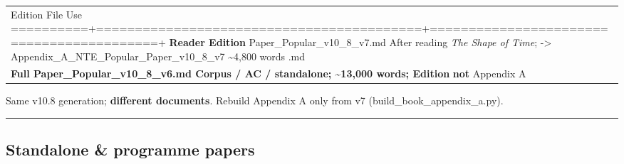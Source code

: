 \documentclass[
  11pt,
]{article}
\newcounter{none} %
\begin{document}
{\def\LTcaptype{none} %
\begin{longtable}[]{@{}
  >{\raggedright\arraybackslash}p{}@{}}
\toprule\noalign{}
\endhead
\bottomrule\noalign{}
\endlastfoot
Edition \textbar{} File \textbar{} Use \textbar{}
==========+==========================================+==========================================+
\textbf{Reader Edition} \textbar{} Paper\_Popular\_v10\_8\_v7.md
\textbar{} After reading \emph{The Shape of Time}; \textbar{}
-\textgreater{} Appendix\_A\_NTE\_Popular\_Paper\_v10\_8\_v7 \textbar{}
\textasciitilde4,800 words \textbar{} .md \textbar{} \\
\textbf{Full \textbar{} Paper\_Popular\_v10\_8\_v6.md \textbar{} Corpus
/ AC / standalone; \textasciitilde13,000 words; \textbar{} Edition}
\textbar{} \textbar{} \textbf{not} Appendix A \textbar{} \\
\end{longtable}
}

Same v10.8 generation; \textbf{different documents}. Rebuild Appendix A
only from v7 (build\_book\_appendix\_a.py).

\begin{center}\rule{0.5\linewidth}{0.5pt}\end{center}

\subsection{Standalone \& programme
papers}\label{standalone-programme-papers}
\end{document}
